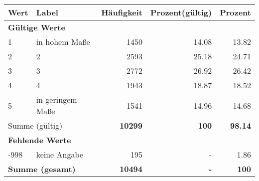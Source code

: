     \begin{longtable}{lXrrr}
     \toprule
     \textbf{Wert} & \textbf{Label} & \textbf{Häufigkeit} & \textbf{Prozent(gültig)} & \textbf{Prozent} \\
     \endhead
     \midrule
     \multicolumn{5}{l}{\textbf{Gültige Werte}}\\

     1 &
     \multicolumn{1}{X}{ in hohem Maße   } &


       \num{1450} &
       \num[round-mode=places,round-precision=2]{14,08} &
         \num[round-mode=places,round-precision=2]{13,82} \\

     2 &
     \multicolumn{1}{X}{ 2   } &


       \num{2593} &
       \num[round-mode=places,round-precision=2]{25,18} &
         \num[round-mode=places,round-precision=2]{24,71} \\

     3 &
     \multicolumn{1}{X}{ 3   } &


       \num{2772} &
       \num[round-mode=places,round-precision=2]{26,92} &
         \num[round-mode=places,round-precision=2]{26,42} \\

     4 &
     \multicolumn{1}{X}{ 4   } &


       \num{1943} &
       \num[round-mode=places,round-precision=2]{18,87} &
         \num[round-mode=places,round-precision=2]{18,52} \\

     5 &
     \multicolumn{1}{X}{ in geringem Maße   } &


       \num{1541} &
       \num[round-mode=places,round-precision=2]{14,96} &
         \num[round-mode=places,round-precision=2]{14,68} \\
     \midrule
     \multicolumn{2}{l}{Summe (gültig)} &
       \textbf{\num{10299}} &
     \textbf{100} &
       \textbf{\num[round-mode=places,round-precision=2]{98,14}} \\
     \multicolumn{5}{l}{\textbf{Fehlende Werte}}\\
       -998 &
       keine Angabe &
         \num{195} &
        - &
         \num[round-mode=places,round-precision=2]{1,86} \\
     \midrule
     \multicolumn{2}{l}{\textbf{Summe (gesamt)}} &
          \textbf{\num{10494}} &
        \textbf{-} &
        \textbf{100} \\
     \bottomrule
     \end{longtable}
     
